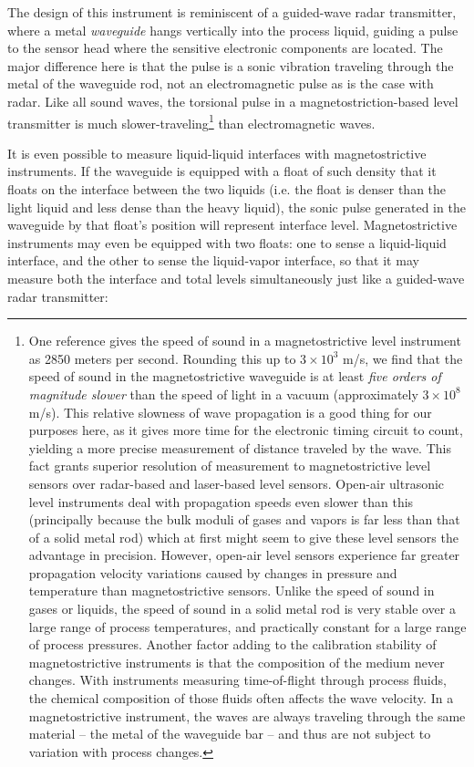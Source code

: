 The design of this instrument is reminiscent of a guided-wave radar transmitter, where a metal \textit{waveguide} hangs vertically into the process liquid, guiding a pulse to the sensor head where the sensitive electronic components are located.  The major difference here is that the pulse is a sonic vibration traveling through the metal of the waveguide rod, not an electromagnetic pulse as is the case with radar.  Like all sound waves, the torsional pulse in a magnetostriction-based level transmitter is much slower-traveling\footnote{One reference gives the speed of sound in a magnetostrictive level instrument as 2850 meters per second.  Rounding this up to $3 \times 10^3$ m/s, we find that the speed of sound in the magnetostrictive waveguide is at least \textit{five orders of magnitude slower} than the speed of light in a vacuum (approximately $3 \times 10^8$ m/s).  This relative slowness of wave propagation is a good thing for our purposes here, as it gives more time for the electronic timing circuit to count, yielding a more precise measurement of distance traveled by the wave.  This fact grants superior resolution of measurement to magnetostrictive level sensors over radar-based and laser-based level sensors.  Open-air ultrasonic level instruments deal with propagation speeds even slower than this (principally because the bulk moduli of gases and vapors is far less than that of a solid metal rod) which at first might seem to give these level sensors the advantage in precision.  However, open-air level sensors experience far greater propagation velocity variations caused by changes in pressure and temperature than magnetostrictive sensors.  Unlike the speed of sound in gases or liquids, the speed of sound in a solid metal rod is very stable over a large range of process temperatures, and practically constant for a large range of process pressures.  Another factor adding to the calibration stability of magnetostrictive instruments is that the composition of the medium never changes.  With instruments measuring time-of-flight through process fluids, the chemical composition of those fluids often affects the wave velocity.  In a magnetostrictive instrument, the waves are always traveling through the same material -- the metal of the waveguide bar -- and thus are not subject to variation with process changes.} than electromagnetic waves.    

\filbreak

It is even possible to measure liquid-liquid interfaces with magnetostrictive instruments.  If the waveguide is equipped with a float of such density that it floats on the interface between the two liquids (i.e. the float is denser than the light liquid and less dense than the heavy liquid), the sonic pulse generated in the waveguide by that float's position will represent interface level.  Magnetostrictive instruments may even be equipped with two floats: one to sense a liquid-liquid interface, and the other to sense the liquid-vapor interface, so that it may measure both the interface and total levels simultaneously just like a guided-wave radar transmitter:

